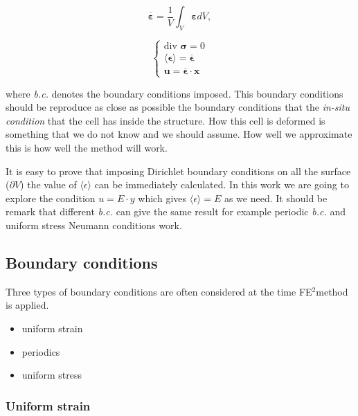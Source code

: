 \documentclass[review]{elsarticle}
\newcommand{\fe}{FE$^2$}
\begin{document}
\begin{equation}
\overline{\bm{\varepsilon}} = \frac{1}{V} \int_{V} \bm{\varepsilon} dV,
\label{strain_ave}
\end{equation}

\begin{equation}
\left\{
\begin{array}{ll}
\text{div } \bm{\sigma} = 0 \\
\langle \bm{\epsilon} \rangle =  \overline{\bm{\epsilon}} \\
\bm{u} = \overline{\bm{\epsilon}} \cdot \bm{x}
\end{array}
\right.
\label{micro_eqs}
\end{equation}

\noindent
where \emph{b.c.} denotes the boundary conditions imposed. This boundary
conditions should be reproduce as close as possible the boundary conditions that
the  \emph{in-situ condition} that the cell has inside the structure. How this
cell is deformed is something that we do not know and we should assume. How well
we approximate this is how well the method will work.

It is easy to prove that imposing Dirichlet boundary conditions on all the
surface ($\partial V$) the value of $\langle \epsilon \rangle$ can be
immediately calculated. In this work we are going to explore the condition 
$ u = E \cdot y $ which gives $\langle \epsilon \rangle = E$ as we need. It
should be remark that different \emph{b.c.} can give the same result for example 
periodic \emph{b.c.} and uniform stress Neumann conditions work.

\subsection{Boundary conditions}

Three types of boundary conditions are often considered at the time \fe method is applied. 

\begin{itemize}
\item uniform strain
\item periodics
\item uniform stress
\end{itemize}

\subsubsection{Uniform strain}
\end{document}

